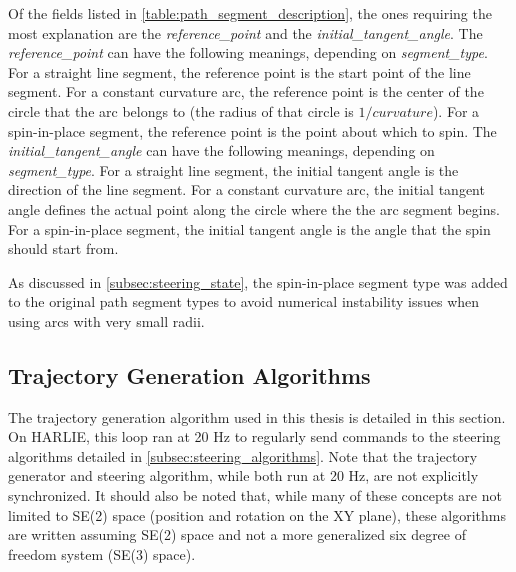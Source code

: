Of the fields listed in \autoref{table:path_segment_description}, the ones requiring the most explanation are the \emph{reference\_point} and the \emph{initial\_tangent\_angle}. The \emph{reference\_point} can have the following meanings, depending on \emph{segment\_type}. For a straight line segment, the reference point is the start point of the line segment. For a constant curvature arc, the reference point is the center of the circle that the arc belongs to (the radius of that circle is $1/curvature$). For a spin-in-place segment, the reference point is the point about which to spin. The \emph{initial\_tangent\_angle} can have the following meanings, depending on \emph{segment\_type}. For a straight line segment, the initial tangent angle is the direction of the line segment. For a constant curvature arc, the initial tangent angle defines the actual point along the circle where the the arc segment begins. For a spin-in-place segment, the initial tangent angle is the angle that the spin should start from. 

As discussed in \autoref{subsec:steering_state}, the spin-in-place segment type was added to the original path segment types to avoid numerical instability issues when using arcs with very small radii.

\subsection{Trajectory Generation Algorithms}\label{subsec:trajectory_generation_algorithm}

The trajectory generation algorithm used in this thesis is detailed in this section. On HARLIE, this loop ran at 20 Hz to regularly send commands to the steering algorithms detailed in \autoref{subsec:steering_algorithms}. Note that the trajectory generator and steering algorithm, while both run at 20 Hz, are not explicitly synchronized. It should also be noted that, while many of these concepts are not limited to SE(2) space (position and rotation on the XY plane), these algorithms are written assuming SE(2) space and not a more generalized six degree of freedom system (SE(3) space).

